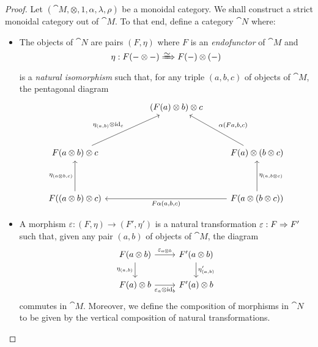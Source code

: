 \documentclass[../../deep-dive]{subfiles}
\begin{document}
\begin{proof}
Let \((\cat M, \otimes, 1, \alpha, \lambda, \rho)\) be a monoidal
category. We shall construct a strict monoidal category out of \(\cat M\). To
that end, define a category \(\cat N\) where:
\begin{itemize}\setlength\itemsep{0em}
\item The objects of \(\cat N\) are pairs \((F, \eta)\) where \(F\) is an
  \emph{endofunctor} of \(\cat M\) and
  \[
  \eta: F(- \otimes -) \isonat F(-) \otimes (-)
  \]
  is a \emph{natural isomorphism} such that, for any triple \((a, b, c)\) of
  objects of \(\cat M\), the pentagonal diagram
  \[
  \begin{tikzcd}
  &
  &(F(a) \otimes b) \otimes c
  &
  \\
  & & &
  \\
  F(a \otimes b) \otimes c
  \ar[rruu, "\eta_{(a, b)} \otimes \Id_c"]
  &
  &
  & F(a) \otimes (b \otimes c)
  \ar[luu, "{\alpha(F a, b, c)}"']
  \\
  & & &
  \\
  F((a \otimes b) \otimes c)
  \ar[uu, "\eta_{(a \otimes b, c)}"]
  &
  &
  &F(a \otimes (b \otimes c))
  \ar[lll, "{F \alpha(a, b, c)}"]
  \ar[uu, "\eta_{(a, b \otimes c)}"']
  \end{tikzcd}
  \]

\item A morphism \(\varepsilon: (F, \eta) \to (F', \eta')\) is a natural
  transformation \(\varepsilon: F \Rightarrow F'\) such that, given any pair \((a, b)\)
  of objects of \(\cat M\), the diagram
  \begin{equation}\label{eq:coherence-morphism-cat-N}
  \begin{tikzcd}
  F(a \otimes b) \ar[d, "\eta_{(a, b)}"']
  \ar[r, "\varepsilon_{a \otimes b}"]
  &F'(a \otimes b) \ar[d, "\eta'_{(a, b)}"]
  \\
  F(a) \otimes b \ar[r, "\varepsilon_a \otimes \Id_b"']
  &F'(a) \otimes b
  \end{tikzcd}
  \end{equation}
  commutes in \(\cat M\). Moreover, we define the composition of morphisms in
  \(\cat N\) to be given by the vertical composition of natural transformations.


\end{itemize}
\end{proof}
\end{document}

